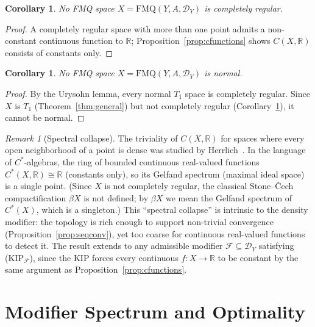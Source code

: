 \documentclass[11pt]{article}
\newtheorem{corollary}[theorem]{Corollary}
\theoremstyle{definition}
\theoremstyle{remark}
\newtheorem{remark}[theorem]{Remark}
\begin{document}
\begin{corollary}\label{cor:notCR}
No FMQ space $X = \mathrm{FMQ}(Y,A,\mathcal{D}_Y)$ is completely regular.
\end{corollary}
\begin{proof}
A completely regular space with more than one point admits a non-constant
continuous function to $\mathbb{R}$; Proposition~\ref{prop:cfunctions} shows
$C(X,\mathbb{R})$ consists of constants only.
\end{proof}

\begin{corollary}\label{cor:notnormal}
No FMQ space $X = \mathrm{FMQ}(Y,A,\mathcal{D}_Y)$ is normal.
\end{corollary}
\begin{proof}
By the Urysohn lemma, every normal $T_1$ space is completely regular.
Since $X$ is $T_1$ (Theorem~\ref{thm:general}) but not completely regular
(Corollary~\ref{cor:notCR}), it cannot be normal.
\end{proof}

\begin{remark}[Spectral collapse]\label{rmk:gelfand}
The triviality of $C(X, \mathbb{R})$ for spaces where every
open neighborhood of a point is dense was studied by
Herrlich~\cite{bib:herrlich}.
In the language of $C^*$-algebras, the ring of bounded continuous
real-valued functions $C^*(X, \mathbb{R}) \cong \mathbb{R}$
(constants only), so its Gelfand spectrum (maximal ideal space) is a
single point.
(Since $X$ is not completely regular, the classical Stone--\v{C}ech
compactification $\beta X$ is not defined; by $\beta X$ we mean
the Gelfand spectrum of $C^*(X)$, which is a singleton.)
This ``spectral collapse'' is intrinsic to the density modifier:
the topology is rich enough to support non-trivial
convergence (Proposition~\ref{prop:seqconv}), yet too coarse for
continuous real-valued functions to detect it.
The result extends to any admissible modifier
$\mathcal{F} \subseteq \mathcal{D}_Y$ satisfying
\textup{(KIP$_{\mathcal{F}}$)}, since the KIP forces every
continuous $f\colon X \to \mathbb{R}$ to be constant by the same
argument as Proposition~\ref{prop:cfunctions}.
\end{remark}

\section{Modifier Spectrum and Optimality}\label{sec:modifiers}
\end{document}
